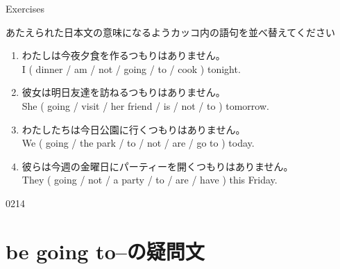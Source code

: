 \documentclass[aspectratio=169,xcolor={dvipsnames,table}]{beamer}
\newcommand{\myaudio}[1]{\href{#1}{\faVolumeUp}}
\begin{document}
\begin{frame}[plain]{Exercises}

 {\small あたえられた日本文の意味になるようカッコ内の語句を並べ替えてください}

\begin{enumerate}
 \item わたしは今夜夕食を作るつもりはありません。\\
I ( dinner / am / not / going / to / cook ) tonight.\\
\hfill{}
 \item 彼女は明日友達を訪ねるつもりはありません。\\
She ( going / visit / her friend / is / not / to ) tomorrow.\\
\hfill{}
 \item わたしたちは今日公園に行くつもりはありません。\\
We ( going / the park / to / not / are / go to ) today.\\
\hfill{}
 \item 彼らは今週の金曜日にパーティーを開くつもりはありません。\\
They ( going / not / a party / to / are / have ) this Friday.\\
\hfill{}
\end{enumerate}
\hfill{\tiny 0214}\,{\scriptsize \myaudio{./audio/011_be_going_to_05.mp3}}
\end{frame}

\section{be going to--の疑問文}
\end{document}
